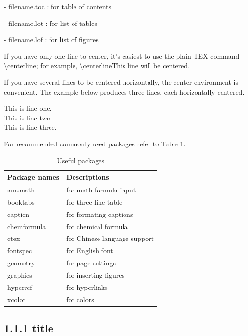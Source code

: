 \documentclass[a4paper,11pt,UTF8,openright]{book}
\begin{document}
- filename.toc : for table of contents

- filename.lot : for list of tables

- filename.lof : for list of figures

\vskip 0.1in
If you have only one line to center, it’s easiest to use the plain TEX command
\textbackslash centerline; for example,
\textbackslash centerline{This line will be centered}.

If you have several lines to be centered horizontally, the center environment is convenient. The example below produces three lines, each horizontally centered.

\begin{center}
	This is line one. \\
	This is line two. \\
	This is line three.
\end{center}

\noindent For recommended commonly used packages refer to Table \ref{tab:useful packages}.

\begin{center}
	\begin{table}[!htbp]
		\caption{Useful packages}
		\label{tab:useful packages}
		\begin{tabular}{@{}p{}p{}@{}}
			\toprule
			\textbf{Package names} & \textbf{Descriptions}  \\ 
			\midrule
			amsmath	& for math formula input \\
			booktabs & for three-line table \\
			caption & for formating captions \\
			chemformula & for chemical formula \\
			ctex & for Chinese language support \\
			fontspec & for English font \\
			geometry & for page settings \\
			graphics & for inserting figures \\
			hyperref & for hyperlinks \\
			xcolor & for colors \\
			\bottomrule
		\end{tabular}
	\end{table}
\end{center}

\subsection{1.1.1 title}
\end{document}
